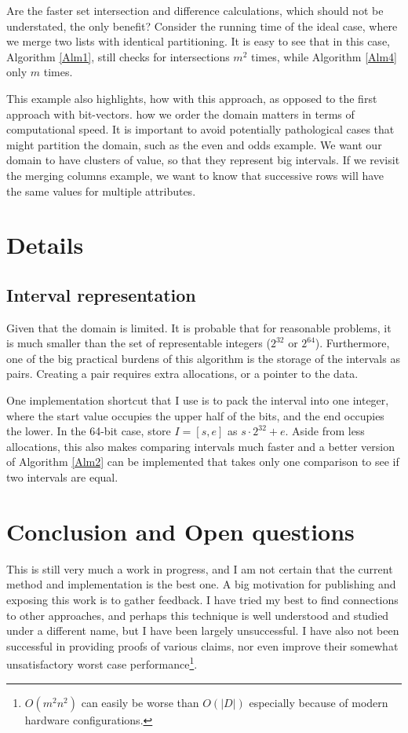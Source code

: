 \documentclass{article}
\begin{document}
Are the faster set intersection and difference calculations,
which should not be understated,
the only benefit?
Consider the running time of the ideal case,
where we merge two lists with identical partitioning.
It is easy to see that in this case,
Algorithm \ref{Alm1},
still checks for intersections $m^{2}$ times,
while Algorithm \ref{Alm4} only $m$ times.

This example also highlights,
how with this approach,
as opposed to the first approach with bit-vectors.
how we order the domain matters in terms of computational speed.
It is important to avoid potentially pathological cases that might
partition the domain, such as the even and odds example.
We want our domain to have clusters of value,
so that they represent big intervals.
If we revisit the merging columns example,
we want to know that successive rows will have the same values for
multiple attributes.

\section{Details}

\subsection{Interval representation}

Given that the domain is limited.
It is probable that for reasonable problems,
it is much smaller than the set of representable integers ($2^{32}$ or $2^64$).
Furthermore,
one of the big practical burdens of this algorithm is the storage of the intervals
as pairs.
Creating a pair requires extra allocations, or a pointer to the data.

One implementation shortcut that I use is to pack the interval into one integer,
where the start value occupies the upper half of the bits,
and the end occupies the lower.
In the 64-bit case, store $I = [s,e]$ as  $s \cdot 2^{32}+e$.
Aside from less allocations,
this also makes comparing intervals much faster
and a better version of Algorithm \ref{Alm2} can be implemented that
takes only one comparison to see if two intervals are equal.

\section{Conclusion and Open questions}

This is still very much a work in progress,
and I am not certain that the current method and implementation is the best one.
A big motivation for publishing and exposing this work is to gather feedback.
I have tried my best to find connections to other approaches,
and perhaps this technique is well understood and studied under a different name,
but I have been largely unsuccessful.
I have also not been successful in providing proofs of various claims,
nor even improve their somewhat unsatisfactory worst case
performance\footnote{$O(m^{2}n^{2})$ can easily be worse than $O(|D|)$ especially because
of modern hardware configurations.}.
\end{document}
